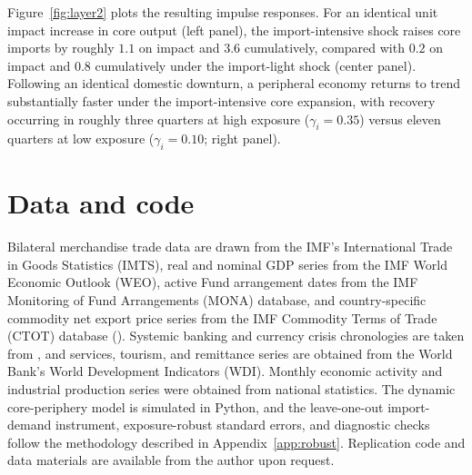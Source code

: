 \documentclass[12pt, a4paper]{article}
\begin{document}
Figure~\ref{fig:layer2} plots the resulting impulse responses. For an identical unit impact increase in core output (left panel), the import-intensive shock raises core imports by roughly $1.1$ on impact and $3.6$ cumulatively, compared with $0.2$ on impact and $0.8$ cumulatively under the import-light shock (center panel). Following an identical domestic downturn, a peripheral economy returns to trend substantially faster under the import-intensive core expansion, with recovery occurring in roughly three quarters at high exposure ($\gamma_i=0.35$) versus eleven quarters at low exposure ($\gamma_i=0.10$; right panel).

\section{Data and code}\label{app:code}
Bilateral merchandise trade data are drawn from the IMF's International Trade in Goods Statistics (IMTS), real and nominal GDP series from the IMF World Economic Outlook (WEO), active Fund arrangement dates from the IMF Monitoring of Fund Arrangements (MONA) database, and country-specific commodity net export price series from the IMF Commodity Terms of Trade (CTOT) database (\citealt{gruss2019}). Systemic banking and currency crisis chronologies are taken from \citet{laeven2020}, and services, tourism, and remittance series are obtained from the World Bank's World Development Indicators (WDI). Monthly economic activity and industrial production series were obtained from national statistics. The dynamic core-periphery model is simulated in Python, and the leave-one-out import-demand instrument, exposure-robust standard errors, and diagnostic checks follow the methodology described in Appendix~\ref{app:robust}. Replication code and data materials are available from the author upon request.
\end{document}
